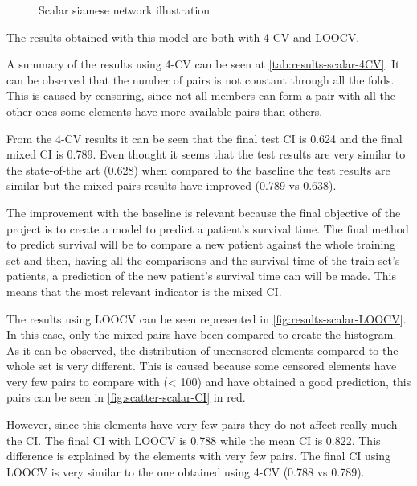 \begin{figure}
  \centering
  
  \caption{Scalar siamese network illustration \label{fig:scalar-implement}}
\end{figure}


The results obtained with this model are both with 4-CV and \gls{LOOCV}. 

A summary of the results using 4-CV can be seen at \autoref{tab:results-scalar-4CV}. It can be
observed that the number of pairs is not constant through all the folds. This is caused by
censoring, since not all members can form a pair with all the other ones some elements 
have more available pairs than others. 

From the 4-CV results it can be seen that the final test \gls{CI} is 0.624 and the final mixed 
\gls{CI} is 0.789. Even thought it seems that the test results are very similar to the
state-of-the art (0.628) when compared to the baseline the test results are similar but
the mixed pairs results have improved (0.789 vs 0.638).

The improvement with the baseline is relevant because the final objective of the project
is to create a model to predict a patient's survival time. The final method to predict
survival will be to compare a new patient against the whole training set and then, having
all the comparisons and the survival time of the train set's patients, a prediction of
the new patient's survival time can will be made. This means that the most relevant 
indicator is the mixed \gls{CI}.

The results using \gls{LOOCV} can be seen represented in \autoref{fig:results-scalar-LOOCV}. 
In this case, only the mixed pairs have been compared to create the histogram. As it can be 
observed, the distribution of uncensored elements compared to the whole set is very different. 
This is caused because some censored elements have very few pairs to compare with (< 100) and 
have obtained a good prediction, this pairs can be seen in \autoref{fig:scatter-scalar-CI} in red.

However, since this elements have very few pairs they do not affect really much the \gls{CI}.
The final \gls{CI} with \gls{LOOCV} is 0.788 while the mean \gls{CI} is 0.822. This difference
is explained by the elements with very few pairs. The final \gls{CI} using \gls{LOOCV} is 
very similar to the one obtained using 4-CV (0.788 vs 0.789).

